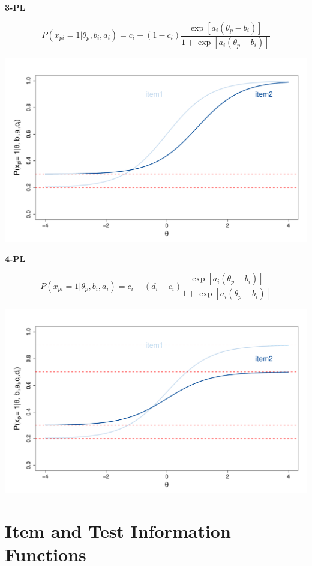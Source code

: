 \documentclass[aspectratio=149, compress]{beamer}
\begin{document}
\begin{frame}


\begin{overprint}
	
	\begin{center}
		\textbf{3-PL}
	\end{center}
	\small
	$$P(x_{pi} = 1| \theta_p, b_i, a_i) = c_i + (1 - c_i) \dfrac{\exp[a_i(\theta_p - b_i)]}{1+\exp[a_i(\theta_p - b_i)]}$$
	
	\centering
	\includegraphics[width=.75\linewidth]{img/icc-3pl}
	
		\begin{center}
		\textbf{4-PL}
	\end{center}
	\small
	$$P(x_{pi} = 1| \theta_p, b_i, a_i) = c_i + (d_i - c_i) \dfrac{\exp[a_i(\theta_p - b_i)]}{1+\exp[a_i(\theta_p - b_i)]}$$
	
		\centering
	\includegraphics[width=.75\linewidth]{img/icc-4pl}
\end{overprint}

		
		

\end{frame}


\section[IFs]{Item and Test Information Functions}
\end{document}

